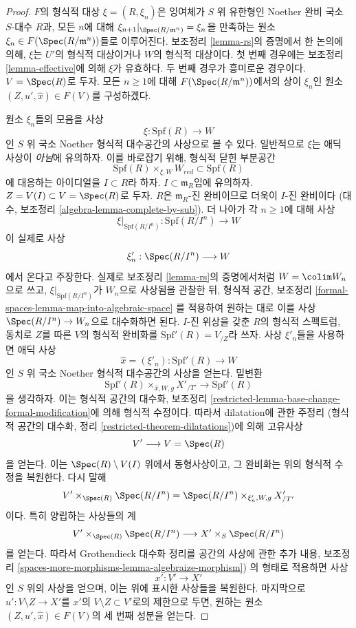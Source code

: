 \begin{proof}
$F$의 형식적 대상 $\xi = (R, \xi_n)$은 잉여체가 $S$ 위 유한형인
Noether 완비 국소 $S$-대수 $R$과, 모든 $n$에 대해
$\xi_{n + 1}|_{\Spec(R/\mathfrak m^n)} = \xi_n$을 만족하는 원소
$\xi_n \in F(\Spec(R/\mathfrak m^n))$들로 이루어진다.
보조정리 \ref{lemma-rs}의 증명에서 한 논의에 의해,
$\xi$는 $U'$의 형식적 대상이거나 $W$의 형식적 대상이다.
첫 번째 경우에는 보조정리 \ref{lemma-effective}에 의해 $\xi$가 유효하다.
두 번째 경우가 흥미로운 경우이다. $V = \Spec(R)$로 두자.
모든 $n \geq 1$에 대해 $F(\Spec(R/\mathfrak m^n))$에서의 상이
$\xi_n$인 원소 $(Z, u', \hat x) \in F(V)$를 구성하겠다.

\medskip\noindent
원소 $\xi_n$들의 모음을 사상
$$
\xi : \text{Spf}(R) \longrightarrow W
$$
인 $S$ 위 국소 Noether 형식적 대수공간의 사상으로 볼 수 있다.
일반적으로 $\xi$는 애딕 사상이 {\it 아님}에 유의하자.
이를 바로잡기 위해, 형식적 닫힌 부분공간
$$
\text{Spf}(R) \times_{\xi, W} W_{red} \subset \text{Spf}(R)
$$
에 대응하는 아이디얼을 $I \subset R$라 하자.
$I \subset \mathfrak m_R$임에 유의하자.
$Z = V(I) \subset V = \Spec(R)$로 두자.
$R$은 $\mathfrak m_R$-진 완비이므로 더욱이 $I$-진 완비이다
(대수, 보조정리 \ref{algebra-lemma-complete-by-sub}).
더 나아가 각 $n \geq 1$에 대해 사상
$$
\xi|_{\text{Spf}(R/I^n)} :
\text{Spf}(R/I^n)
\longrightarrow
W
$$
이 실제로 사상
$$
\xi'_n :  \Spec(R/I^n) \longrightarrow W
$$
에서 온다고 주장한다. 실제로 보조정리 \ref{lemma-rs}의 증명에서처럼
$W = \colim W_n$으로 쓰고, $\xi|_{\text{Spf}(R/I^n)}$가 $W_n$으로
사상됨을 관찰한 뒤, 형식적 공간, 보조정리
\ref{formal-spaces-lemma-map-into-algebraic-space}
를 적용하여 원하는 대로 이를 사상 $\Spec(R/I^n) \to W_n$으로
대수화하면 된다. $I$-진 위상을 갖춘 $R$의 형식적 스펙트럼,
동치로 $Z$를 따른 $V$의 형식적 완비화를
$\text{Spf}'(R) = V_{/Z}$라 쓰자. 사상 $\xi'_n$들을 사용하면
애딕 사상
$$
\hat x = (\xi'_n) : \text{Spf}'(R) \longrightarrow W
$$
인 $S$ 위 국소 Noether 형식적 대수공간의 사상을 얻는다.
밑변환
$$
\text{Spf}'(R) \times_{\hat x, W, g} X'_{/T'} \longrightarrow \text{Spf}'(R)
$$
을 생각하자. 이는 형식적 공간의 대수화, 보조정리
\ref{restricted-lemma-base-change-formal-modification}에 의해
형식적 수정이다. 따라서 dilatation에 관한 주정리
(형식적 공간의 대수화, 정리 \ref{restricted-theorem-dilatations})에 의해
고유사상
$$
V' \longrightarrow V = \Spec(R)
$$
을 얻는다. 이는 $\Spec(R) \setminus V(I)$ 위에서 동형사상이고,
그 완비화는 위의 형식적 수정을 복원한다. 다시 말해
$$
V' \times_{\Spec(R)} \Spec(R/I^n) =
\Spec(R/I^n) \times_{\xi'_n, W, g} X'_{/T'}
$$
이다. 특히 양립하는 사상들의 계
$$
V' \times_{\Spec(R)} \Spec(R/I^n) \longrightarrow X' \times_S \Spec(R/I^n)
$$
를 얻는다. 따라서 Grothendieck 대수화 정리를 공간의 사상에 관한 추가 내용,
보조정리
\ref{spaces-more-morphisms-lemma-algebraize-morphism})
의 형태로 적용하면 사상
$$
x' : V' \to X'
$$
인 $S$ 위의 사상을 얻으며, 이는 위에 표시한 사상들을 복원한다.
마지막으로 $u' : V \setminus Z \to X'$를 $x'$의
$V \setminus Z \subset V'$로의 제한으로 두면, 원하는 원소
$(Z, u', \hat x) \in F(V)$의 세 번째 성분을 얻는다.
\end{proof}

